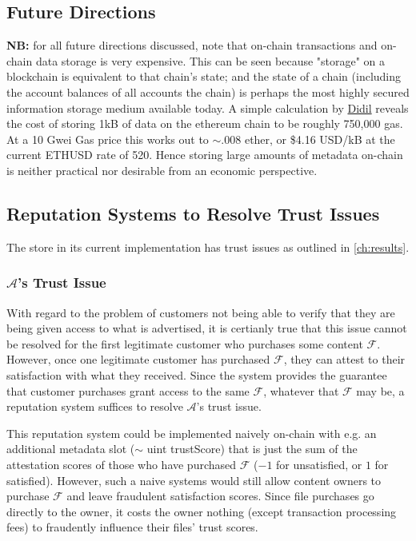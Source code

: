 \documentclass[12pt,oneside]{amsart}
\def\file{\mathcal{F}}
\def\alice{\mathcal{A}}
\def\nb{\textbf{NB:} }
\begin{document}
\begin{multicols}{2}
\section{Future Directions} \label{ch:future}

\nb for all future directions discussed, note that on-chain transactions and on-chain data storage is very expensive.
This can be seen because "storage" on a blockchain is equivalent to that chain's state; and the state of a chain (including the account balances of all accounts the chain) is perhaps the most highly secured information storage medium available today.
A simple calculation by \href{https://medium.com/@didil/off-chain-data-storage-ethereum-ipfs-570e030432cf}{Didil} reveals the cost of storing 1kB of data on the ethereum chain to be roughly 750,000 gas.
At a 10 Gwei Gas price this works out to $\sim .008$ ether, or \$4.16 USD/kB at the current ETHUSD rate of 520.
Hence storing large amounts of metadata on-chain is neither practical nor desirable from an economic perspective.

\subsection{Reputation Systems to Resolve Trust Issues}
The store in its current implementation has trust issues as outlined in \ref{ch:results}.

\subsubsection{$\alice$'s Trust Issue}
With regard to the problem of customers not being able to verify that they are being given access to what is advertised, it is certianly true that this issue cannot be resolved for the first legitimate customer who purchases some content $\file$.
However, once one legitimate customer has purchased $\file$, they can attest to their satisfaction with what they received.
Since the system provides the guarantee that customer purchases grant access to the same $\file$, whatever that $\file$ may be, a reputation system suffices to resolve $\alice$'s trust issue.

This reputation system could be implemented naively on-chain with e.g. an additional metadata slot ($\sim$ uint trustScore) that is just the sum of the attestation scores of those who have purchased $\file$ ($-1$ for unsatisfied, or $1$ for satisfied).
However, such a naive systems would still allow content owners to purchase $\file$ and leave fraudulent satisfaction scores.
Since file purchases go directly to the owner, it costs the owner nothing (except transaction processing fees) to fraudently influence their files' trust scores.


\end{multicols}
\end{document}
